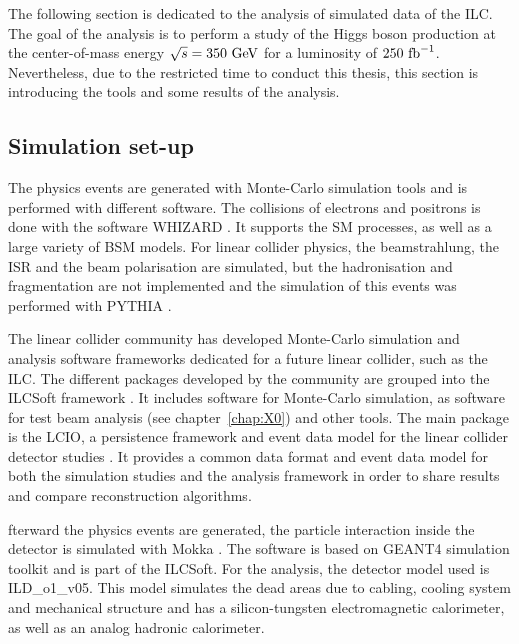     The following section is dedicated to the analysis of simulated data of the \gls{ILC}.
    The goal of the analysis is to perform a study of the Higgs boson production at the center-of-mass energy $\sqrt{s} = 350~\rm{GeV}$ for a luminosity of $250~\rm{fb}^{-1}$.
    Nevertheless, due to the restricted time to conduct this thesis, this section is introducing the tools and some results of the analysis.

  \subsection{Simulation set-up}  
  \label{subsec:ILCSOFT}

    The physics events are generated with Monte-Carlo simulation tools and is performed with different software.
    The collisions of electrons and positrons is done with the software WHIZARD \cite{WHIZARD}.
    It supports the \gls{SM} processes, as well as a large variety of BSM models.
    For linear collider physics, the beamstrahlung, the \gls{ISR} and the beam polarisation are simulated, but the hadronisation and fragmentation are not implemented and the simulation of this events was performed with PYTHIA \cite{PYTHIA}.
  
    The linear collider community has developed Monte-Carlo simulation and analysis software frameworks dedicated for a future linear collider, such as the \gls{ILC}. 
    The different packages developed by the community are grouped into the ILCSoft framework \cite{ilcsoft}.
    It includes software for Monte-Carlo simulation, as software for test beam analysis (see chapter~\ref{chap:X0}) and other tools.
    The main package is the \gls{LCIO}, a persistence framework and event data model for the linear collider detector studies \cite{lcio}. 
    It provides a common data format and event data model for both the simulation studies and the analysis framework in order to share results and compare reconstruction algorithms.

    fterward the physics events are generated, the particle interaction inside the detector is simulated with Mokka \cite{Mokka}.
    The software is based on GEANT4 simulation toolkit \cite{GEANT4} and is part of the ILCSoft.
    For the analysis, the detector model used is ILD\_o1\_v05.
    This model simulates the dead areas due to cabling, cooling system and mechanical structure and has a silicon-tungsten electromagnetic calorimeter, as well as an analog hadronic calorimeter.
    
